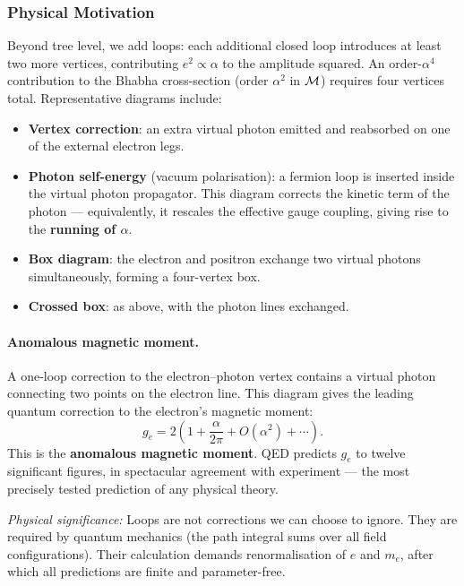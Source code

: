 \documentclass[../main.tex]{subfiles}
\begin{document}
\subsubsection*{Physical Motivation}

Beyond tree level, we add loops: each additional closed loop introduces at least two more vertices, contributing $e^2\propto\alpha$ to the amplitude squared.  An order-$\alpha^4$ contribution to the Bhabha cross-section (order $\alpha^2$ in $\mathcal{M}$) requires four vertices total.  Representative diagrams include:

\begin{itemize}
  \item \textbf{Vertex correction}: an extra virtual photon emitted and reabsorbed on one of the external electron legs.
  \item \textbf{Photon self-energy} (vacuum polarisation): a fermion loop is inserted inside the virtual photon propagator.  This diagram corrects the kinetic term of the photon — equivalently, it rescales the effective gauge coupling, giving rise to the \textbf{running of $\alpha$}.
  \item \textbf{Box diagram}: the electron and positron exchange two virtual photons simultaneously, forming a four-vertex box.
  \item \textbf{Crossed box}: as above, with the photon lines exchanged.
\end{itemize}

\paragraph{Anomalous magnetic moment.}

A one-loop correction to the electron--photon vertex contains a virtual photon connecting two points on the electron line.  This diagram gives the leading quantum correction to the electron's magnetic moment:
\begin{equation}
  \boxed{
  g_e = 2\!\left(1 + \frac{\alpha}{2\pi} + O(\alpha^2) + \cdots\right).}
  \label{eq:lec11:g-minus-2}
\end{equation}
This is the \textbf{anomalous magnetic moment}.  QED predicts $g_e$ to twelve significant figures, in spectacular agreement with experiment — the most precisely tested prediction of any physical theory.

\textit{Physical significance:} Loops are not corrections we can choose to ignore.  They are required by quantum mechanics (the path integral sums over all field configurations).  Their calculation demands renormalisation of $e$ and $m_e$, after which all predictions are finite and parameter-free.
\end{document}
